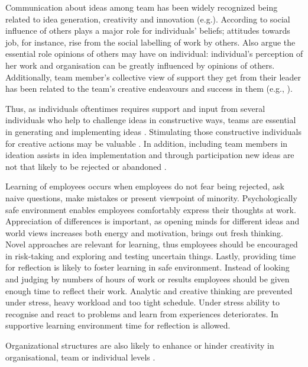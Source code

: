 Communication about ideas among team has been widely recognized being related to idea generation, creativity and innovation (e.g.\citep{robinson1997corporate,mumford2002social,monge1992communication,amabile1996assessing}). According to \citet{staw1989tradeoff} social influence of others plays a major role for individuals' beliefs; attitudes towards job, for instance, rise from the social labelling of work by others.  Also \citet{salancik1978social} argue the essential role opinions of others may have on individual: individual's perception of her work and organisation can be greatly influenced by opinions of others. Additionally, team member's collective view of support they get from their leader has been related to the team's creative endeavours and success in them (e.g., \citep{amabile1998kill,amabile1996assessing}). 
 
Thus, as individuals oftentimes requires support and input from several individuals who help to challenge ideas in constructive ways, teams are essential in generating and implementing ideas \citep{mumford2002social}. Stimulating those constructive individuals for creative actions may be valuable \citep{robinson1997corporate}. In addition, including team members in ideation assists in idea implementation and through participation new ideas are not that likely to be rejected or abandoned \citep{agrell1994team}.

Learning of employees occurs when employees do not fear being rejected, ask naive questions, make mistakes or present viewpoint of minority. Psychologically safe environment enables employees comfortably express their thoughts at work. Appreciation of differences is important, as opening minds for different ideas and world views increases both energy and motivation, brings out fresh thinking. Novel approaches are relevant for learning, thus employees should be encouraged in risk-taking and exploring and testing uncertain things. Lastly, providing time for reflection is likely to foster learning in safe environment. Instead of looking and judging by numbers of hours of work or results employees should be given enough time to reflect their work. Analytic and creative thinking are prevented under stress, heavy workload and too tight schedule. Under stress ability to recognise and react to problems and learn from experiences deteriorates. In supportive learning environment time for reflection is allowed. \citep{garvin2008yours} 

Organizational structures are also likely to enhance or hinder creativity in organisational, team or individual levels \citep{shalley2004leaders}. 

